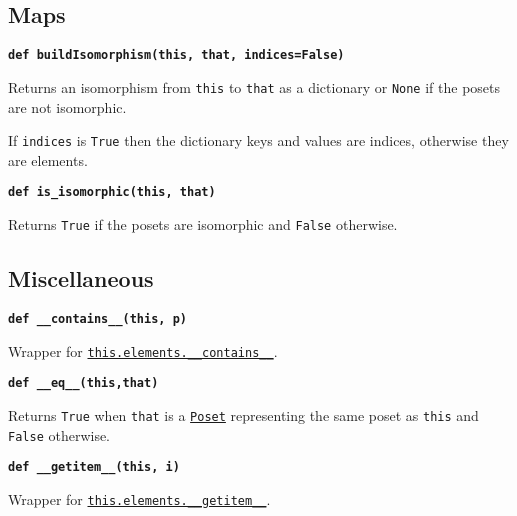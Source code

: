 \documentclass[12pt]{article}
\begin{document}
\begin{child}
\subsection{Maps}
\label{Maps}

\textbf{\hypertarget{Poset.buildIsomorphism}{\texttt{def buildIsomorphism(this, that, indices=False)}}}
{\list{}{\leftmargin 0.5cm}\item{
Returns an isomorphism from \verb|this| to \verb|that| as a dictionary
or \verb|None| if the posets are not isomorphic.

If \verb|indices| is \verb|True| then the dictionary keys and values
are indices, otherwise they are elements.


}\endlist}

\textbf{\hypertarget{Poset.is_isomorphic}{\texttt{def is\_isomorphic(this, that)}}}
{\list{}{\leftmargin 0.5cm}\item{
Returns \verb|True| if the posets are isomorphic and \verb|False| otherwise.


}\endlist}

\subsection{Miscellaneous}
\label{Miscellaneous}

\textbf{\hypertarget{Poset.__contains__}{\texttt{def \_\_contains\_\_(this, p)}}}
{\list{}{\leftmargin 0.5cm}\item{
Wrapper for \hyperlink{Poset.__contains__}{\texttt{this.elements.\_\_contains\_\_}}.


}\endlist}

\textbf{\hypertarget{Poset.__eq__}{\texttt{def \_\_eq\_\_(this,that)}}}
{\list{}{\leftmargin 0.5cm}\item{
Returns \verb|True| when \verb|that| is a \hyperlink{Poset}{\texttt{Poset}} representing the same poset as \verb|this| and \verb|False| otherwise.


}\endlist}

\textbf{\hypertarget{Poset.__getitem__}{\texttt{def \_\_getitem\_\_(this, i)}}}
{\list{}{\leftmargin 0.5cm}\item{
Wrapper for \hyperlink{Poset.__getitem__}{\texttt{this.elements.\_\_getitem\_\_}}.


}}
\end{child}
\end{document}
